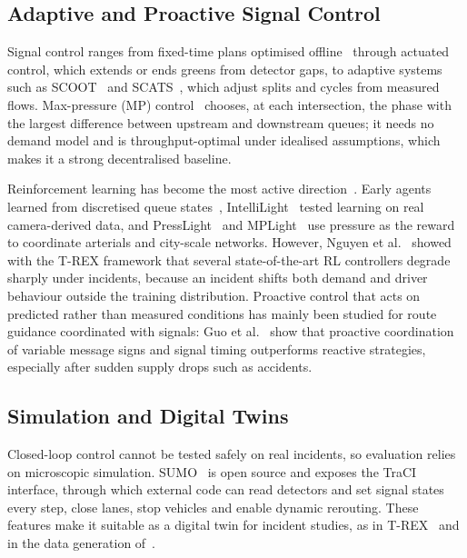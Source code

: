 \documentclass[conference]{IEEEtran}
\begin{document}
\subsection{Adaptive and Proactive Signal Control}
Signal control ranges from fixed-time plans optimised offline~\cite{webster1958} through actuated control, which extends or ends greens from detector gaps, to adaptive systems such as SCOOT~\cite{robertson1991scoot} and SCATS~\cite{sims1980scats}, which adjust splits and cycles from measured flows. Max-pressure (MP) control~\cite{varaiya2013maxpressure} chooses, at each intersection, the phase with the largest difference between upstream and downstream queues; it needs no demand model and is throughput-optimal under idealised assumptions, which makes it a strong decentralised baseline.

Reinforcement learning has become the most active direction~\cite{wei2019survey}. Early agents learned from discretised queue states~\cite{genders2016deep}, IntelliLight~\cite{wei2018intellilight} tested learning on real camera-derived data, and PressLight~\cite{wei2019presslight} and MPLight~\cite{chen2020mplight} use pressure as the reward to coordinate arterials and city-scale networks. However, Nguyen et al.~\cite{nguyen2025trex} showed with the T-REX framework that several state-of-the-art RL controllers degrade sharply under incidents, because an incident shifts both demand and driver behaviour outside the training distribution. Proactive control that acts on predicted rather than measured conditions has mainly been studied for route guidance coordinated with signals: Guo et al.~\cite{proactive2023divergent} show that proactive coordination of variable message signs and signal timing outperforms reactive strategies, especially after sudden supply drops such as accidents.

\subsection{Simulation and Digital Twins}
Closed-loop control cannot be tested safely on real incidents, so evaluation relies on microscopic simulation. SUMO~\cite{lopez2018sumo} is open source and exposes the TraCI interface, through which external code can read detectors and set signal states every step, close lanes, stop vehicles and enable dynamic rerouting. These features make it suitable as a digital twin for incident studies, as in T-REX~\cite{nguyen2025trex} and in the data generation of~\cite{patil2026incident}.
\end{document}
